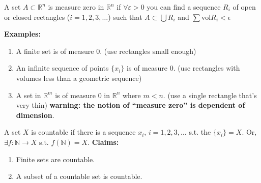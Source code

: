 \documentclass[a4paper]{article}
\numberwithin{equation}{section}
\newcommand{\R}{\mathbb{R}}
\begin{document}
\begin{definition}
    A set $A\subset\R^n$ is measure zero in $\R^n$ if $\forall\varepsilon>0$ you can find a sequence $R_i$ of open or closed rectangles ($i=1,2,3,\dots$) such that $A\subset\bigcup R_i$ and $\sum\mathrm{vol}R_i<\epsilon$

    \textbf{Examples:}
    \begin{enumerate}
        \item A finite set is of measure 0. (use rectangles small enough)
        \item An infinite sequence of points $\{x_i\}$ is of measure 0. (use rectangles with volumes less than a geometric sequence)
        \item A set in $\R^m$ is of measure 0 in $\R^n$ where $m<n$. (use a single rectangle that's very thin) \textbf{warning: the notion of ``measure zero'' is dependent of dimension}.
    \end{enumerate}
\end{definition}

\begin{definition}[Countability]
    A set $X$ is countable if there is a sequence $x_i$, $i=1,2,3,\dots$ s.t. the $\{x_i\}=X$. Or, $\exists f:\mathbb{N}\to X$ s.t. $f(\mathbb N)=X$.
    \textbf{Claims:}
    \begin{enumerate}
        \item Finite sets are countable.
        \item A subset of a countable set is countable.
    \end{enumerate}
\end{definition}
\end{document}
